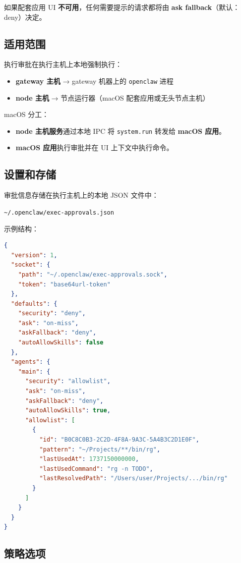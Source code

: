 如果配套应用 UI \textbf{不可用}，任何需要提示的请求都将由 \textbf{ask fallback}（默认：deny）决定。

\subsection{适用范围}


执行审批在执行主机上本地强制执行：

\begin{itemize}
  \item \textbf{gateway 主机} → gateway 机器上的 \texttt{openclaw} 进程
  \item \textbf{node 主机} → 节点运行器（macOS 配套应用或无头节点主机）
\end{itemize}


macOS 分工：

\begin{itemize}
  \item \textbf{node 主机服务}通过本地 IPC 将 \texttt{system.run} 转发给 \textbf{macOS 应用}。
  \item \textbf{macOS 应用}执行审批并在 UI 上下文中执行命令。
\end{itemize}


\subsection{设置和存储}


审批信息存储在执行主机上的本地 JSON 文件中：

\texttt{\textasciitilde{}/.openclaw/exec-approvals.json}

示例结构：

\begin{lstlisting}[language=json]
{
  "version": 1,
  "socket": {
    "path": "~/.openclaw/exec-approvals.sock",
    "token": "base64url-token"
  },
  "defaults": {
    "security": "deny",
    "ask": "on-miss",
    "askFallback": "deny",
    "autoAllowSkills": false
  },
  "agents": {
    "main": {
      "security": "allowlist",
      "ask": "on-miss",
      "askFallback": "deny",
      "autoAllowSkills": true,
      "allowlist": [
        {
          "id": "B0C8C0B3-2C2D-4F8A-9A3C-5A4B3C2D1E0F",
          "pattern": "~/Projects/**/bin/rg",
          "lastUsedAt": 1737150000000,
          "lastUsedCommand": "rg -n TODO",
          "lastResolvedPath": "/Users/user/Projects/.../bin/rg"
        }
      ]
    }
  }
}
\end{lstlisting}


\subsection{策略选项}


